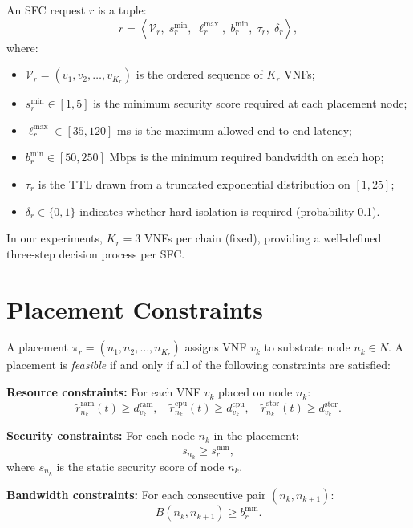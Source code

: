 An SFC request $r$ is a tuple:
\begin{equation}
r = \left\langle \mathcal{V}_r,\; s_r^{\min},\; \ell_r^{\max},\; b_r^{\min},\; \tau_r,\; \delta_r \right\rangle,
\end{equation}
where:
\begin{itemize}
  \item $\mathcal{V}_r = (v_1, v_2, \ldots, v_{K_r})$ is the ordered sequence of $K_r$ VNFs;
  \item $s_r^{\min} \in [1, 5]$ is the minimum security score required at each placement node;
  \item $\ell_r^{\max} \in [35, 120]$ ms is the maximum allowed end-to-end latency;
  \item $b_r^{\min} \in [50, 250]$ Mbps is the minimum required bandwidth on each hop;
  \item $\tau_r$ is the TTL drawn from a truncated exponential distribution on $[1, 25]$;
  \item $\delta_r \in \{0,1\}$ indicates whether hard isolation is required (probability 0.1).
\end{itemize}

In our experiments, $K_r = 3$ VNFs per chain (fixed), providing a well-defined three-step decision process per SFC.

\section{Placement Constraints}

A placement $\pi_r = (n_1, n_2, \ldots, n_{K_r})$ assigns VNF $v_k$ to substrate node $n_k \in N$. A placement is \textit{feasible} if and only if all of the following constraints are satisfied:

\textbf{Resource constraints:} For each VNF $v_k$ placed on node $n_k$:
\begin{equation}
\tilde{r}_{n_k}^{\text{ram}}(t) \geq d_{v_k}^{\text{ram}}, \quad
\tilde{r}_{n_k}^{\text{cpu}}(t) \geq d_{v_k}^{\text{cpu}}, \quad
\tilde{r}_{n_k}^{\text{stor}}(t) \geq d_{v_k}^{\text{stor}}.
\end{equation}

\textbf{Security constraints:} For each node $n_k$ in the placement:
\begin{equation}
s_{n_k} \geq s_r^{\min},
\end{equation}
where $s_{n_k}$ is the static security score of node $n_k$.

\textbf{Bandwidth constraints:} For each consecutive pair $(n_k, n_{k+1})$:
\begin{equation}
B(n_k, n_{k+1}) \geq b_r^{\min}.
\end{equation}

